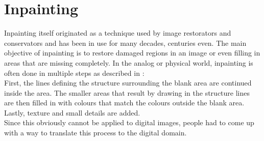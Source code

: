 \section{Inpainting}\label{sec:Inpainting}
Inpainting itself originated as a technique used by image restorators and conservators and has
been in use for many decades, centuries even. The main objective of inpainting is
to restore damaged regions in an image or even filling in areas that are missing
completely. In the analog or physical world, inpainting is often done in multiple steps as
described in \cite{bertalmio00}:\\
First, the lines defining the structure surrounding the blank area are continued inside the area.
The smaller areas that result by drawing in the structure lines are then filled in with colours that
match the colours outside the blank area.
Lastly, texture and small details are added.\\

Since this obviously cannot be applied to digital images, people had to come up with a way to
translate this process to the digital domain.

